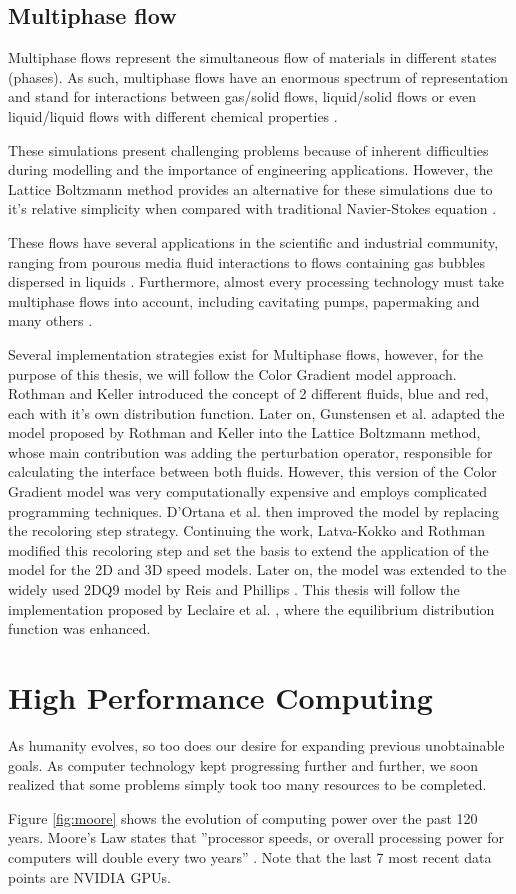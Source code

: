 \documentclass[12pt, openany]{book}
\begin{document}
\subsection{Multiphase flow}
Multiphase flows represent the simultaneous flow of materials in different states (phases). As such, multiphase flows have an enormous spectrum of representation and stand for interactions between gas/solid flows, liquid/solid flows or even liquid/liquid flows with different chemical properties \cite{multiphase}.\par
These simulations present challenging problems because of inherent difficulties during modelling and the importance of engineering applications. However, the Lattice Boltzmann method provides an alternative for these simulations due to it's relative simplicity when compared with traditional Navier-Stokes equation \cite{chenDoolenMP}.
\par These flows have several applications in the scientific and industrial community, ranging from pourous media fluid interactions \cite{pourous} to flows containing gas bubbles dispersed in liquids \cite{gasBubble}. Furthermore, almost every processing technology must take multiphase flows into account, including cavitating pumps, papermaking and many others \cite{multiphase}.
\par Several implementation strategies exist for Multiphase flows, however, for the purpose of this thesis, we will follow the Color Gradient model approach. Rothman and Keller \cite{rk} introduced the concept of 2 different fluids, blue and red, each with it's own distribution function. Later on, Gunstensen et al.  \cite{gunstensen} adapted the model proposed by Rothman and Keller into the Lattice Boltzmann method, whose main contribution was adding the perturbation operator, responsible for calculating the interface between both fluids. However, this version of the Color Gradient model was very computationally expensive and employs complicated programming techniques. D'Ortana et al. \cite{dortana} then improved the model by replacing the recoloring step strategy. Continuing the work, Latva-Kokko and Rothman modified this recoloring step and set the basis to extend the application of the model for the 2D and 3D speed models. Later on, the model was extended to the widely used 2DQ9 model by Reis and Phillips \cite{reisPhil}. This thesis will follow the implementation proposed by Leclaire et al. \cite{leclaire1, leclaire2, leclaire3}, where the equilibrium distribution function was enhanced.


\section{High Performance Computing}
As humanity evolves, so too does our desire for expanding previous unobtainable goals. As computer technology kept progressing further and further, we soon realized that some problems simply took too many resources to be completed.\par
Figure \ref{fig:moore} shows the evolution of computing power over the past 120 years. Moore's Law states that ''processor speeds, or overall processing power for computers will double every two years'' \cite{moore}. Note that the last 7 most recent data points are NVIDIA GPUs.
\end{document}
